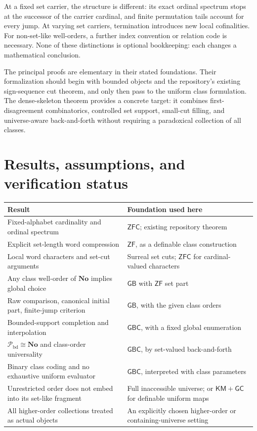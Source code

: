\documentclass[11pt]{article}
\theoremstyle{definition}
\theoremstyle{remark}
\newcommand{\No}{\mathbf{No}}
\newcommand{\Pbd}{\mathcal P_{\mathrm{bd}}}
\newcommand{\GB}{\mathsf{GB}}
\newcommand{\GBC}{\mathsf{GBC}}
\newcommand{\ZFC}{\mathsf{ZFC}}
\newcommand{\ZF}{\mathsf{ZF}}
\newcommand{\KM}{\mathsf{KM}}
\newcommand{\GC}{\mathsf{GC}}
\begin{document}
At a fixed set carrier, the structure is different: its exact ordinal
spectrum stops at the successor of the carrier cardinal, and finite
permutation tails account for every jump. At varying set carriers,
termination introduces new local cofinalities. For non-set-like
well-orders, a further index convention or relation code is necessary.
None of these distinctions is optional bookkeeping: each changes a
mathematical conclusion.

The principal proofs are elementary in their stated foundations.
Their formalization should begin with bounded objects and the
repository's existing sign-sequence cut theorem, and only then pass to
the uniform class formulation. The dense-skeleton theorem provides a
concrete target: it combines first-disagreement combinatorics,
controlled set support, small-cut filling, and universe-aware
back-and-forth without requiring a paradoxical collection of all
classes.

\section{Results, assumptions, and verification status}
\label{swo:sec:status}

\begin{center}
\small
\begin{tabular}{@{}>{\raggedright\arraybackslash}p{}>{\raggedright\arraybackslash}p{}@{}}
\toprule
Result & Foundation used here\\
\midrule
Fixed-alphabet cardinality and ordinal spectrum &
\(\ZFC\); existing repository theorem\\[3pt]
Explicit set-length word compression &
\(\ZF\), as a definable class construction\\[3pt]
Local word characters and set-cut arguments &
Surreal set cuts; \(\ZFC\) for cardinal-valued characters\\[3pt]
Any class well-order of \(\No\) implies global choice &
\(\GB\) with \(\ZF\) set part\\[3pt]
Raw comparison, canonical initial part, finite-jump criterion &
\(\GB\), with the given class orders\\[3pt]
Bounded-support completion and interpolation &
\(\GBC\), with a fixed global enumeration\\[3pt]
\(\Pbd\cong\No\) and class-order universality &
\(\GBC\), by set-valued back-and-forth\\[3pt]
Binary class coding and no exhaustive uniform evaluator &
\(\GBC\), interpreted with class parameters\\[3pt]
Unrestricted order does not embed into its set-like fragment &
Full inaccessible universe; or \(\KM+\GC\) for definable uniform maps\\[3pt]
All higher-order collections treated as actual objects &
An explicitly chosen higher-order or containing-universe setting\\
\bottomrule
\end{tabular}
\end{center}
\end{document}
